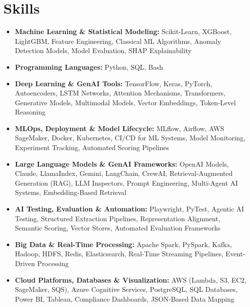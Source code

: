\documentclass[letterpaper,11pt]{article}
\begin{document}
\section{Skills}
\vspace{-4pt}
\begin{itemize}[leftmargin=0in, label={}, itemsep=1pt, topsep=2pt, parsep=0pt]
    \item \small{\textbf{Machine Learning \& Statistical Modeling:} Scikit-Learn, XGBoost, LightGBM, Feature Engineering, Classical ML Algorithms, Anomaly Detection Models, Model Evaluation, SHAP Explainability}
    \item \small{\textbf{Programming Languages:} Python, SQL, Bash}
    \item \small{\textbf{Deep Learning \& GenAI Tools:} TensorFlow, Keras, PyTorch, Autoencoders, LSTM Networks, Attention Mechanisms, Transformers, Generative Models, Multimodal Models, Vector Embeddings, Token-Level Reasoning}
    \item \small{\textbf{MLOps, Deployment \& Model Lifecycle:} MLflow, Airflow, AWS SageMaker, Docker, Kubernetes, CI/CD for ML Systems, Model Monitoring, Experiment Tracking, Automated Scoring Pipelines}
    \item \small{\textbf{Large Language Models \& GenAI Frameworks:} OpenAI Models, Claude, LlamaIndex, Gemini, LangChain, CrewAI, Retrieval-Augmented Generation (RAG), LLM Inspectors, Prompt Engineering, Multi-Agent AI Systems, Embedding-Based Retrieval}
    \item \small{\textbf{AI Testing, Evaluation \& Automation:} Playwright, PyTest, Agentic AI Testing, Structured Extraction Pipelines, Representation Alignment, Semantic Scoring, Vector Stores, Automated Evaluation Frameworks}
    \item \small{\textbf{Big Data \& Real-Time Processing:} Apache Spark, PySpark, Kafka, Hadoop, HDFS, Redis, Elasticsearch, Real-Time Streaming Pipelines, Event-Driven Processing}
    \item \small{\textbf{Cloud Platforms, Databases \& Visualization:} AWS (Lambda, S3, EC2, SageMaker, SQS), Azure Cognitive Services, PostgreSQL, SQL Databases, Power BI, Tableau, Compliance Dashboards, JSON-Based Data Mapping}
\end{itemize}
\end{document}

